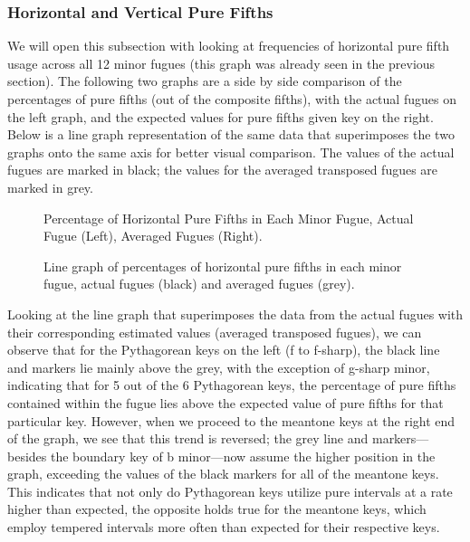 \subsubsection{Horizontal and Vertical Pure
Fifths}\label{horizontal-and-vertical-pure-fifths}

We will open this subsection with looking at frequencies of horizontal
pure fifth usage across all 12 minor fugues (this graph was already seen
in the previous section). The following two graphs are a side by side
comparison of the percentages of pure fifths (out of the composite
fifths), with the actual fugues on the left graph, and the expected
values for pure fifths given key on the right. Below is a line graph
representation of the same data that superimposes the two graphs onto
the same axis for better visual comparison. The values of the actual
fugues are marked in black; the values for the averaged transposed
fugues are marked in grey.



\begin{figure}[H]
\vspace{1.5em}
    \centering
    \caption[Percentage of Horizontal Pure Fifths in Each Minor Fugue. ]{Percentage of Horizontal Pure Fifths in Each Minor Fugue, Actual Fugue (Left), Averaged Fugues (Right).}
\end{figure}


\begin{figure}[H]
\vspace{1.5em}
    \centering
    \caption[Line graph of percentages of horizontal pure fifths in each minor fugue, actual fugues vs. averaged fugues. ]{Line graph of percentages of horizontal pure fifths in each minor fugue, actual fugues (black) and averaged fugues (grey).}
\end{figure}    Looking at the line graph that superimposes the data from the actual
fugues with their corresponding estimated values (averaged transposed
fugues), we can observe that for the Pythagorean keys on the left (f to
f-sharp), the black line and markers lie mainly above the grey, with the
exception of g-sharp minor, indicating that for 5 out of the 6
Pythagorean keys, the percentage of pure fifths contained within the
fugue lies above the expected value of pure fifths for that particular
key. However, when we proceed to the meantone keys at the right end of
the graph, we see that this trend is reversed; the grey line and
markers---besides the boundary key of b minor---now assume the
higher position in the graph, exceeding the values of the black markers
for all of the meantone keys. This indicates that not only do
Pythagorean keys utilize pure intervals at a rate higher than expected,
the opposite holds true for the meantone keys, which employ tempered
intervals more often than expected for their respective keys.


